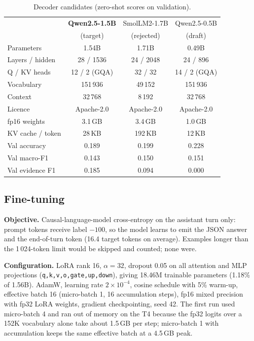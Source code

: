 \documentclass[conference]{IEEEtran}
\begin{document}
\begin{table}[t]
\centering
\caption{Decoder candidates (zero-shot scores on validation).}
\label{tab:models}
\footnotesize
\setlength{\tabcolsep}{2.5pt}
\begin{tabular}{lccc}
\toprule
 & \textbf{Qwen2.5-1.5B} & SmolLM2-1.7B & Qwen2.5-0.5B \\
 & (target) & (rejected) & (draft) \\
\midrule
Parameters & 1.54B & 1.71B & 0.49B \\
Layers / hidden & 28 / 1536 & 24 / 2048 & 24 / 896 \\
Q / KV heads & 12 / 2 (GQA) & 32 / 32 & 14 / 2 (GQA) \\
Vocabulary & 151\,936 & 49\,152 & 151\,936 \\
Context & 32\,768 & 8\,192 & 32\,768 \\
Licence & Apache-2.0 & Apache-2.0 & Apache-2.0 \\
fp16 weights & 3.1\,GB & 3.4\,GB & 1.0\,GB \\
KV cache / token & 28\,KB & 192\,KB & 12\,KB \\
\midrule
Val accuracy & 0.189 & 0.199 & 0.228 \\
Val macro-F1 & 0.143 & 0.150 & 0.151 \\
Val evidence F1 & 0.185 & 0.094 & 0.000 \\
\bottomrule
\end{tabular}
\end{table}

\subsection{Fine-tuning}
\textbf{Objective.} Causal-language-model cross-entropy on the assistant turn only: prompt tokens receive label $-100$, so the model learns to emit the JSON answer and the end-of-turn token (16.4 target tokens on average). Examples longer than the 1\,024-token limit would be skipped and counted; none were.

\textbf{Configuration.} LoRA rank 16, $\alpha=32$, dropout 0.05 on all attention and MLP projections (\texttt{q,k,v,o,gate,up,down}), giving 18.46M trainable parameters (1.18\% of 1.56B). AdamW, learning rate $2\times10^{-4}$, cosine schedule with 5\% warm-up, effective batch 16 (micro-batch 1, 16 accumulation steps), fp16 mixed precision with fp32 LoRA weights, gradient checkpointing, seed 42. The first run used micro-batch 4 and ran out of memory on the T4 because the fp32 logits over a 152K vocabulary alone take about 1.5\,GB per step; micro-batch 1 with accumulation keeps the same effective batch at a 4.5\,GB peak.
\end{document}
